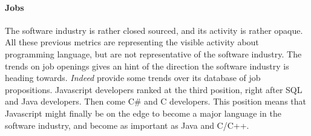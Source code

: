 


\paragraph{Jobs}

The software industry is rather closed sourced, and its activity is rather opaque.
All these previous metrics are representing the visible activity about programming language, but are not representative of the software industry.
The trends on job openings gives an hint of the direction the software industry is heading towards.
\textit{Indeed} provide some trends over its database of job propositions.
Javascript developers ranked at the third position, right after SQL and Java developers.
Then come C\# and C developers.
This position means that Javascript might finally be on the edge to become a major language in the software industry, and become as important as Java and C/C++.

